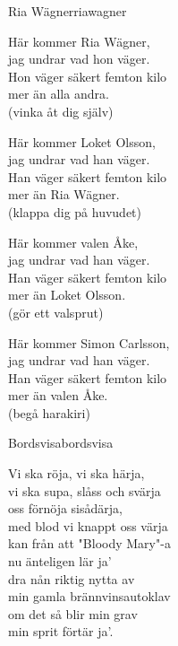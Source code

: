 \begin{song}{Ria Wägner}{riawagner}
\begin{vers}
Här kommer Ria Wägner,\\
jag undrar vad hon väger.\\
Hon väger säkert femton kilo\\
mer än alla andra.\\
  (vinka åt dig själv)\\
\end{vers}
\begin{vers}
Här kommer Loket Olsson,\\
jag undrar vad han väger.\\
Han väger säkert femton kilo\\
mer än Ria Wägner.\\
  (klappa dig på huvudet)\\
\end{vers}
\begin{vers}
Här kommer valen Åke,\\
jag undrar vad han väger.\\
Han väger säkert femton kilo\\
mer än Loket Olsson.\\
  (gör ett valsprut)\\
\end{vers}
\begin{vers}
Här kommer Simon Carlsson,\\
jag undrar vad han väger.\\
Han väger säkert femton kilo\\
mer än valen Åke.\\
  (begå harakiri)
\end{vers}
\end{song}

\newpage


\begin{song}{Bordsvisa}{bordsvisa}
\begin{vers}

Vi ska röja, vi ska härja,\\
vi ska supa, slåss och svärja\\
oss förnöja sisådärja,\\
med blod vi knappt oss värja\\
kan från att "Bloody Mary"-a\\
nu änteligen lär ja'\\
dra nån riktig nytta av  \\
min gamla brännvinsautoklav\\
om det så blir min grav\\
min sprit förtär ja'.\\
\end{vers}
\end{song}

